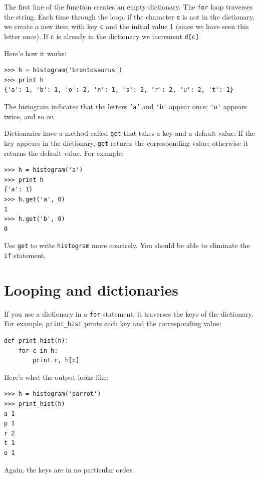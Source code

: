 \documentclass[10pt]{book}
\begin{document}
\begin{CJK}{UTF8}{gbsn}
The first line of the
function creates an empty dictionary.  The {\tt for} loop traverses
the string.  Each time through the loop, if the character {\tt c} is
not in the dictionary, we create a new item with key {\tt c} and the
initial value 1 (since we have seen this letter once).  If {\tt c} is
already in the dictionary we increment {\tt d[c]}.

Here's how it works:

\begin{verbatim}
>>> h = histogram('brontosaurus')
>>> print h
{'a': 1, 'b': 1, 'o': 2, 'n': 1, 's': 2, 'r': 2, 'u': 2, 't': 1}
\end{verbatim}
%
The histogram indicates that the letters {\tt 'a'} and \verb"'b'"
appear once; \verb"'o'" appears twice, and so on.

\begin{exercise}

Dictionaries have a method called {\tt get} that takes a key
and a default value.  If the key appears in the dictionary,
{\tt get} returns the corresponding value; otherwise it returns
the default value.  For example:

\begin{verbatim}
>>> h = histogram('a')
>>> print h
{'a': 1}
>>> h.get('a', 0)
1
>>> h.get('b', 0)
0
\end{verbatim}
%
Use {\tt get} to write {\tt histogram} more concisely.  You
should be able to eliminate the {\tt if} statement.
\end{exercise}


\section{Looping and dictionaries}

If you use a dictionary in a {\tt for} statement, it traverses
the keys of the dictionary.  For example, \verb"print_hist"
prints each key and the corresponding value:

\begin{verbatim}
def print_hist(h):
    for c in h:
        print c, h[c]
\end{verbatim}
%
Here's what the output looks like:

\begin{verbatim}
>>> h = histogram('parrot')
>>> print_hist(h)
a 1
p 1
r 2
t 1
o 1
\end{verbatim}
%
Again, the keys are in no particular order.


\end{CJK}
\end{document}
